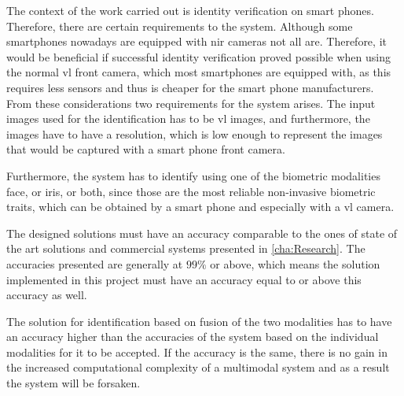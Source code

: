The context of the work carried out is identity verification on smart phones. Therefore, there are certain requirements to the system. Although some smartphones nowadays are equipped with \gls{nir} cameras not all are. Therefore, it would be beneficial if successful identity verification proved possible when using the normal \gls{vl} front camera, which most smartphones are equipped with, as this requires less sensors and thus is cheaper for the smart phone manufacturers. From these considerations two requirements for the system arises. The input images used for the identification has to be \gls{vl} images, and furthermore, the images have to have a resolution, which is low enough to represent the images that would be captured with a smart phone front camera.

Furthermore, the system has to identify using one of the biometric modalities face, or iris, or both, since those are the most reliable non-invasive biometric traits, which can be obtained by a smart phone and especially with a \gls{vl} camera. 

The designed solutions must have an accuracy comparable to the ones of state of the art solutions and commercial systems presented in \autoref{cha:Research}. The accuracies presented are generally at $99\%$ or above, which means the solution implemented in this project must have an accuracy equal to or above this accuracy as well. 

The solution for identification based on fusion of the two modalities has to have an accuracy higher than the accuracies of the system based on the individual modalities for it to be accepted. If the accuracy is the same, there is no gain in the increased computational complexity of a multimodal system and as a result the system will be forsaken.

